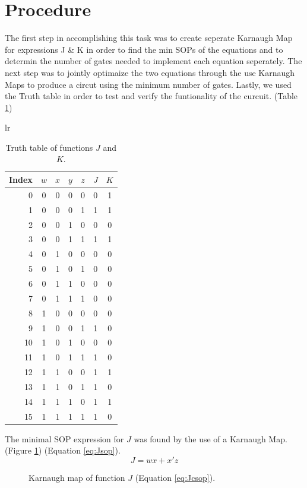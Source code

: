 \documentclass[12pt]{article}
\begin{document}
\section{Procedure}
\label{sec:procedure}
The first step in accomplishing this task was to create seperate Karnaugh Map for expressions J \& K in order to find the min SOPs of the equations and to determin the number of gates needed to implement each equation seperately. The next step was to jointly optimaize the two equations through the use Karnaugh Maps to produce a circut using the minimum number of gates. Lastly, we used the Truth table in order to test and verify the funtionality of the curcuit.
(Table \ref{tbl:tt})
\begin{table}[htb]
\begin{center}
\begin{tabular}{lr}
\begin{tabular}[t]{r|cccc|c|c}
Index&$w$&$x$&$y$&$z$&$J$&$K$\\
\hline
0 &0&0&0&0 &0 &1\\
1 &0&0&0&1 &1 &1\\
2 &0&0&1&0 &0 &0\\
3 &0&0&1&1 &1 &1\\
4 &0&1&0&0 &0 &0\\
5 &0&1&0&1 &0 &0\\
6 &0&1&1&0 &0 &0\\
7 &0&1&1&1 &0 &0\\
8 &1&0&0&0 &0 &0\\
9 &1&0&0&1 &1 &0\\
10 &1&0&1&0 &0 &0\\
11 &1&0&1&1 &1 &0\\
12 &1&1&0&0 &1 &1\\
13 &1&1&0&1 &1 &0\\
14 &1&1&1&0 &1 &1\\
15 &1&1&1&1 &1 &0\\
\end{tabular}
\end{tabular}
\end{center}
\caption{Truth table of functions $J$ and $K$.}
\label{tbl:tt}
\end{table}
The minimal SOP expression for $J$ was found by the use of a Karnaugh Map.
(Figure \ref{fig:Jmap})
(Equation \ref{eq:Jsop}).
\begin{equation}
J = w x + x' z \label{eq:Jsop}
\end{equation}
\begin{figure}[!hbt]
\begin{center}
\end{center}
\caption{Karnaugh map of function $J$ (Equation \ref{eq:Jcsop}).}
\label{fig:Jmap}
\end{figure}
\end{document}
